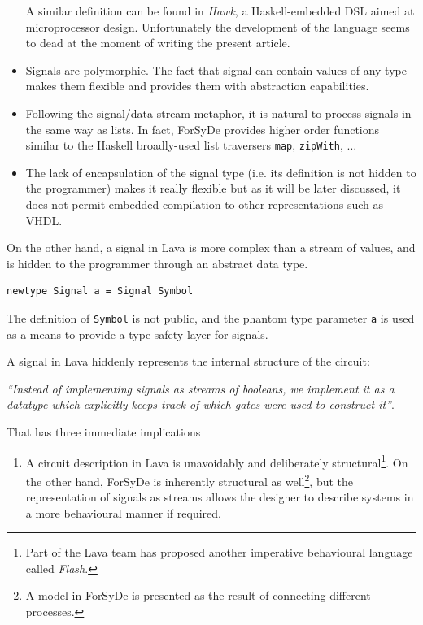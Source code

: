 \documentclass[a4paper,twoside,11pt]{article}
\begin{document}
\begin{body}
\begin{itemize}
  A similar definition can be found in \textit{Hawk}\cite{hawk}, a
  Haskell-embedded DSL aimed at microprocessor design. Unfortunately
  the development of the language seems to dead at the moment of
  writing the present article.

\item Signals are polymorphic. The fact that signal can contain values
  of any type makes them flexible and provides them with abstraction
  capabilities.
 
\item Following the signal/data-stream metaphor, it is natural to
  process signals in the same way as lists. In fact, ForSyDe provides
  higher order functions similar to the Haskell broadly-used list traversers
  \texttt{map}, \texttt{zipWith}, $\dots$

\item The lack of encapsulation of the signal type (i.e. its
  definition is not hidden to the programmer) makes it really flexible
  but as it will be later discussed, it does not permit embedded compilation
  to other representations such as VHDL.
\end{itemize}


On the other hand, a signal in Lava is more complex than a stream of
values, and is hidden to the programmer through an abstract data type.

\begin{lstlisting}
newtype Signal a = Signal Symbol 
\end{lstlisting}

\lstset{basicstyle=\tiny}

The definition of \texttt{Symbol} is not public, and the phantom type
parameter \texttt{a} is used as a means to provide a type safety layer
for signals.


A signal in Lava hiddenly represents the internal structure of the circuit:


\textit{``Instead of implementing signals as streams of booleans, we
  implement it as a datatype which explicitly keeps track of which
  gates were used to construct it''}\cite[section 1.6]{lava:thesis}.

That has three immediate implications

\begin{enumerate}[1)]
\item A circuit description in Lava is unavoidably and deliberately
  structural\footnote{Part of the Lava team has proposed another imperative
    behavioural language called \textit{Flash}\cite{flash}.}. On the
  other hand, ForSyDe is inherently structural as well\footnote{A
    model in ForSyDe is presented as the result of connecting
    different processes.}, but the representation of signals as
  streams allows the designer to describe systems in a more behavioural
  manner if required.


\end{enumerate}
\end{body}
\end{document}
